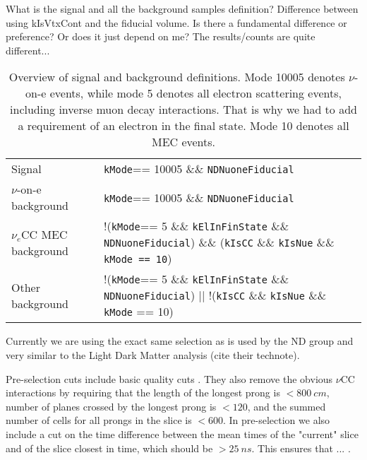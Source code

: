 What is the signal and all the background samples definition? Difference between using kIsVtxCont and the fiducial volume. Is there a fundamental difference or preference? Or does it just depend on me? The results/counts are quite different...

\begin{table}[!ht]
\centering
\def\arraystretch{1.4}
\begin{tabular}{p{}p{}}
Signal                   & \texttt{kMode}== 10005 \&\& \texttt{NDNuoneFiducial}\\
$\nu$-on-e background    & \texttt{kMode}== 10005 \&\& \texttt{NDNuoneFiducial}\\
$\nu_e$CC MEC background & !(\texttt{kMode}== 5 \&\& \texttt{kElInFinState} \&\& \texttt{NDNuoneFiducial}) \&\& (\texttt{kIsCC} \&\& \texttt{kIsNue} \&\& \texttt{kMode == 10})\\
Other background         & !(\texttt{kMode}== 5 \&\& \texttt{kElInFinState} \&\& \texttt{NDNuoneFiducial}) $||$ !(\texttt{kIsCC} \&\& \texttt{kIsNue} \&\& \texttt{kMode} == 10)
\end{tabular}
\caption{Overview of signal and background definitions. Mode 10005 denotes $\nu$-on-e events, while mode 5 denotes all electron scattering events, including inverse muon decay interactions. That is why we had to add a requirement of an electron in the final state. Mode 10 denotes all MEC events.}
\label{tab:SignalDefinitions}
\end{table}

Currently we are using the exact same selection as is used by the ND group \cite{NOVA-doc-56383} and very similar to the Light Dark Matter analysis (cite their technote).

Pre-selection cuts include basic quality cuts . They also remove the obvious $\nu$CC interactions by requiring that the length of the longest prong is $<800\ \unit{cm}$, number of planes crossed by the longest prong is $<120$, and the summed number of cells for all prongs in the slice is $<600$. In pre-selection we also include a cut on the time difference between the mean times of the "current" slice and of the slice closest in time, which should be $>25\ \unit{ns}$. This ensures that ... .

